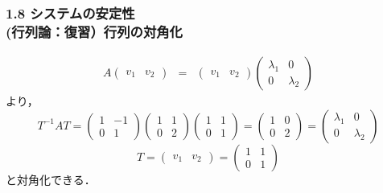 \documentclass[10pt]{beamer}
\begin{document}
\begin{frame}[t]
\frametitle{1.8 システムの安定性 \\
 (行列論：復習）行列の対角化}
\addtocounter{equation}{-1}
\begin{eqnarray}
 A
 \left(
 \begin{array}{cc}
  v_1 & v_2
 \end{array}
 \right)
 &= &
 \left(
 \begin{array}{cc}
  v_1 & v_2
 \end{array}
 \right)
 \left(
 \begin{array}{cc}
  \lambda_1 & 0 \\
  0 & \lambda_2
 \end{array}
 \right)
\end{eqnarray}
より，
\begin{equation}
 T^{-1}AT =
 \left(
 \begin{array}{cc}
  1 & -1 \\
  0 & 1
 \end{array}
 \right)
 \left(
 \begin{array}{cc}
  1 & 1 \\
  0 & 2
 \end{array}
 \right)
 \left(
 \begin{array}{cc}
  1 & 1 \\
  0 & 1
 \end{array}
 \right) =
 \left(
 \begin{array}{cc}
  1 & 0 \\
  0 & 2
 \end{array}
 \right) =
 \left(
 \begin{array}{cc}
  \lambda_1 & 0 \\
  0 & \lambda_2
 \end{array}
 \right)
\end{equation}
\begin{equation}
  T = 
 \left(
 \begin{array}{cc}
  v_1 & v_2
 \end{array}
 \right)
 =
 \left(
 \begin{array}{cc}
  1 & 1 \\
  0 & 1
 \end{array}
 \right)
\end{equation}
と対角化できる．
\end{frame}
\end{document}
